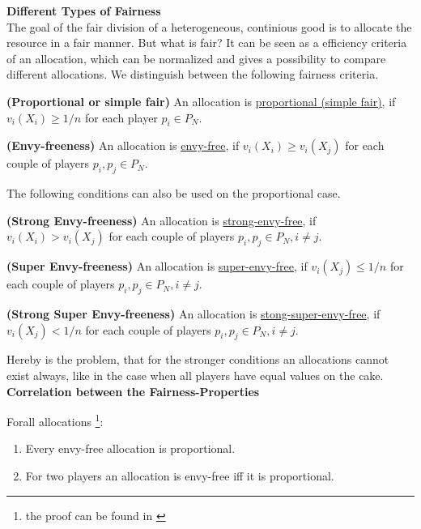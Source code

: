 \textbf{Different Types of Fairness}\\
\newline
The goal of the fair division of a heterogeneous, continious good is to allocate the resource in a fair manner. But what is fair? It can be seen as a efficiency criteria of an allocation, which can be normalized and gives a possibility to compare different allocations. We distinguish between the following fairness criteria. \\
\begin{defi}{\textbf{(Proportional or simple fair)}}
\newline An allocation is \underline{proportional (simple fair)}, if
$v_i(X_i) \geq 1/n$ for each player $p_i \in P_N$.
\end{defi}
\begin{defi}{\textbf{(Envy-freeness)}}
\newline An allocation is \underline{envy-free}, if $v_i(X_i) \geq
v_i(X_j)$ for each couple of players $p_i, p_j \in P_N$.
\end{defi}
The following conditions can also be used on the proportional case.\\
\begin{defi}{\textbf{(Strong Envy-freeness)}}
\newline  An allocation is \underline{strong-envy-free}, if $v_i(X_i) >
v_i(X_j)$ for each couple of players $p_i, p_j \in P_N, i \neq j$.
\end{defi}
\begin{defi}{\textbf{(Super Envy-freeness)}}
\newline An allocation is \underline{super-envy-free}, if $v_i(X_j) \leq
1/n$  for each couple of players $p_i, p_j \in P_N, i \neq j$.
\end{defi}
\begin{defi}{\textbf{(Strong Super Envy-freeness)}}
\newline An allocation is \underline{stong-super-envy-free}, if $v_i(X_j) <
1/n$  for each couple of players $p_i, p_j \in P_N, i \neq j$.
\end{defi}
Hereby is the problem, that for the stronger conditions an allocations cannot exist always, like in the case when all players have equal values on the cake.\\
\newline
\textbf{Correlation between the Fairness-Properties}\\
\newline
\begin{lem}
Forall allocations \footnote{the proof can be found in \cite{}}:
\begin{enumerate}
\item Every envy-free allocation is proportional.
\item For two players an allocation is envy-free iff it is proportional.
\end{enumerate}
\end{lem}
